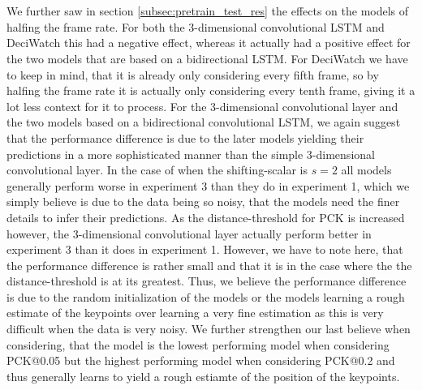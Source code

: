 \documentclass[./main.tex]{subfiles}
\begin{document}
\\
\\
We further saw in section \ref{subsec:pretrain_test_res} the effects on the models of halfing the frame rate. For both the 3-dimensional convolutional LSTM and DeciWatch this had a negative effect, whereas it actually had a positive effect for the two models that are based on a bidirectional LSTM. For DeciWatch we have to keep in mind, that it is already only considering every fifth frame, so by halfing the frame rate it is actually only considering every tenth frame, giving it a lot less context for it to process. For the 3-dimensional convolutional layer and the two models based on a bidirectional convolutional LSTM, we again suggest that the performance difference is due to the later models yielding their predictions in a more sophisticated manner than the simple 3-dimensional convolutional layer. In the case of when the shifting-scalar is $s = 2$ all models generally perform worse in experiment 3 than they do in experiment 1, which we simply believe is due to the data being so noisy, that the models need the finer details to infer their predictions. As the distance-threshold for PCK is increased however, the 3-dimensional convolutional layer actually perform better in experiment 3 than it does in experiment 1. However, we have to note here, that the performance difference is rather small and that it is in the case where the the distance-threshold is at its greatest. Thus, we believe the performance difference is due to the random initialization of the models or the models learning a rough estimate of the keypoints over learning a very fine estimation as this is very difficult when the data is very noisy. We further strengthen our last believe when considering, that the model is the lowest performing model when considering PCK@0.05 but the highest performing model when considering PCK@0.2 and thus generally learns to yield a rough estiamte of the position of the keypoints.
\\
\\
\end{document}
